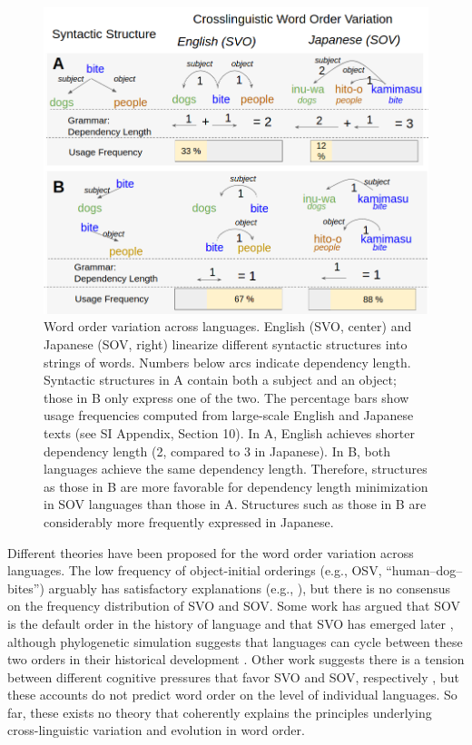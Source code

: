 \documentclass[9pt,twocolumn,twoside,lineno]{pnas-new}
\begin{document}
\begin{figure}[ht!]
    \centering
	\includegraphics[width=.8\textwidth]{introductory-figure.png}
\caption{
Word order variation across languages.
English (SVO, center) and Japanese (SOV, right) linearize different syntactic structures into strings of words.
Numbers below arcs indicate dependency length.
Syntactic structures in A contain both a subject and an object; those in B only express one of the two.
The percentage bars show usage frequencies computed from large-scale English and Japanese texts (see SI Appendix, Section 10).
In A, English achieves shorter dependency length (2, compared to 3 in Japanese).
In B, both languages achieve the same dependency length.
Therefore, structures as those in B are more favorable for dependency length minimization in SOV languages than those in A.
Structures such as those in B are considerably more frequently expressed in Japanese.
}
        \label{fig:sent-dep}
\end{figure}

Different theories have been proposed for the word order variation across languages. The low frequency of object-initial orderings (e.g., OSV, ``human--dog--bites'') arguably has satisfactory explanations (e.g., \cite{tomlin1986basic}), but there is no consensus on the frequency distribution of SVO and SOV. Some work has argued that SOV is the default order in the history of language and that SVO has emerged later \citep{givon1979understanding,senghas1997argument, newmeyer2000evolutionary, goldin-meadow2008natural, gibson-noisy-channel-2013}, although phylogenetic simulation suggests that languages can cycle between these two orders in their historical development \citep{maurits2014tracing}. Other work suggests there is a tension between different cognitive pressures that favor SVO and SOV, respectively \citep{langus2010cognitive, ferrer-i-cancho-placement-2017}, but these accounts do not predict word order on the level of individual languages. So far, these exists no theory that coherently explains the principles underlying cross-linguistic variation and evolution in word order.
\end{document}
